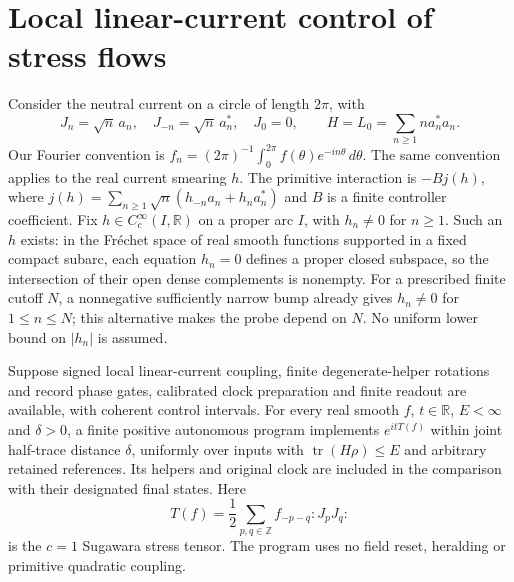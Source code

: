 \section{Local linear-current control of stress flows}
\label{app:linear-stress}

Consider the neutral current on a circle of length $2\pi$, with
\[
 J_n=\sqrt n\,a_n,\quad J_{-n}=\sqrt n\,a_n^*,\quad J_0=0,
 \qquad H=L_0=\sum_{n\geq1}n a_n^*a_n.
\]
Our Fourier convention is $f_n=(2\pi)^{-1}\int_0^{2\pi}
f(\theta)e^{-in\theta}\,d\theta$. The same convention applies to the
real current smearing $h$. The primitive interaction is $-B j(h)$,
where $j(h)=\sum_{n\geq1}\sqrt n(h_{-n}a_n+h_na_n^*)$ and $B$
is a finite controller coefficient. Fix $h\in C_c^\infty(I,\mathbb R)$
on a proper arc $I$, with $h_n\ne0$ for $n\geq1$.
Such an $h$ exists: in the Fr\'echet space of real smooth functions
supported in a fixed compact subarc, each equation $h_n=0$ defines a
proper closed subspace, so the intersection of their open dense
complements is nonempty. For a prescribed finite cutoff $N$, a
nonnegative sufficiently narrow bump already gives $h_n\ne0$ for
$1\leq n\leq N$; this alternative makes the probe depend on $N$.
No uniform lower bound on $|h_n|$ is assumed.

\begin{proposition}
\label{prop:current-stress-compiler}
Suppose signed local linear-current coupling, finite degenerate-helper
rotations and record phase gates, calibrated clock preparation and
finite readout are available, with coherent control intervals.
For every real smooth $f$, $t\in\mathbb R$, $E<\infty$ and
$\delta>0$, a finite positive autonomous program implements
$e^{itT(f)}$ within joint half-trace distance $\delta$, uniformly over
inputs with $\operatorname{tr}(H\rho)\leq E$ and arbitrary retained
references. Its helpers and original clock are included in the
comparison with their designated final states. Here
\[
 T(f)=\frac12\sum_{p,q\in\mathbb Z}
                 f_{-p-q}:J_pJ_q:
\]
is the $c=1$ Sugawara stress tensor. The program uses no field reset,
heralding or primitive quadratic coupling.
\end{proposition}

